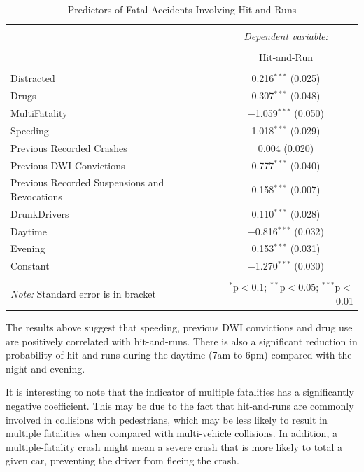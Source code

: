 \documentclass[11pt, oneside,titlepage]{article}   	%
\begin{document}
\begin{table}[H] \centering 
	\label{} 
	\begin{tabular}{@{\extracolsep{5pt}}lc} 
		\\[-1.8ex]\hline 
		\hline \\[-1.8ex] 
		& \multicolumn{1}{c}{\textit{Dependent variable:}} \\ 
		\cline{2-2} 
		\\[-1.8ex] & Hit-and-Run \\ 
		\hline \\[-1.8ex] 
		Distracted & 0.216$^{***}$ (0.025) \\ 
		Drugs & 0.307$^{***}$ (0.048) \\ 
		MultiFatality & $-$1.059$^{***}$ (0.050) \\ 
		Speeding & 1.018$^{***}$ (0.029) \\ 
		Previous Recorded Crashes & 0.004 (0.020) \\ 
		Previous DWI Convictions & 0.777$^{***}$ (0.040) \\ 
		Previous Recorded Suspensions and Revocations & 0.158$^{***}$ (0.007) \\ 
		DrunkDrivers & 0.110$^{***}$ (0.028) \\ 
		Daytime & $-$0.816$^{***}$ (0.032) \\ 
		Evening & 0.153$^{***}$ (0.031) \\ 
		Constant & $-$1.270$^{***}$ (0.030) \\  
		\hline \\[-1.8ex] 
		\textit{Note:} Standard error is in bracket & \multicolumn{1}{r}{$^{*}$p$<$0.1; $^{**}$p$<$0.05; $^{***}$p$<$0.01} \\ 
	\end{tabular} 
	\caption{Predictors of Fatal Accidents Involving Hit-and-Runs}
\end{table} 

The results above suggest that speeding, previous DWI convictions and drug use are positively correlated with hit-and-runs. There is also a significant reduction in probability of hit-and-runs during the daytime (7am to 6pm) compared with the night and evening.

It is interesting to note that the indicator of multiple fatalities has a significantly negative coefficient. This may be due to the fact that hit-and-runs are commonly involved in collisions with pedestrians, which may be less likely to result in multiple fatalities when compared with multi-vehicle collisions. In addition, a multiple-fatality crash might mean a severe crash that is more likely to total a given car, preventing the driver from fleeing the crash.
\end{document}
